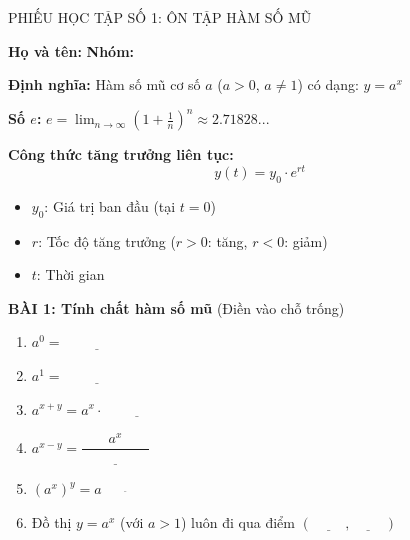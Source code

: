 \documentclass[12pt,a4paper]{article}
\begin{document}
\begin{phieuhoctap}{PHIẾU HỌC TẬP SỐ 1: ÔN TẬP HÀM SỐ MŨ}

\noindent\textbf{Họ và tên:} \underline{\hspace{6cm}} \hfill \textbf{Nhóm:} \underline{\hspace{2cm}}

\vspace{0.5cm}
\begin{mathbox}
\textbf{Định nghĩa:} Hàm số mũ cơ số $a$ ($a > 0$, $a \neq 1$) có dạng: $y = a^x$

\textbf{Số $e$:} $e = \lim_{n \to \infty}\left(1 + \frac{1}{n}\right)^n \approx 2.71828...$

\textbf{Công thức tăng trưởng liên tục:}
$$\boxed{y(t) = y_0 \cdot e^{rt}}$$
\begin{itemize}
\item $y_0$: Giá trị ban đầu (tại $t = 0$)
\item $r$: Tốc độ tăng trưởng ($r > 0$: tăng, $r < 0$: giảm)
\item $t$: Thời gian
\end{itemize}
\end{mathbox}

\vspace{0.5cm}
\textbf{\color{mathblue}BÀI 1: Tính chất hàm số mũ} (Điền vào chỗ trống)

\begin{enumerate}[label=\alph*)]
\item $a^0 = \underline{\hspace{2cm}}$
\item $a^1 = \underline{\hspace{2cm}}$
\item $a^{x+y} = a^x \cdot \underline{\hspace{2cm}}$
\item $a^{x-y} = \dfrac{a^x}{\underline{\hspace{2cm}}}$
\item $(a^x)^y = a^{\underline{\hspace{2cm}}}$
\item Đồ thị $y = a^x$ (với $a > 1$) luôn đi qua điểm $(\underline{\hspace{1cm}}, \underline{\hspace{1cm}})$
\end{enumerate}


\end{phieuhoctap}
\end{document}
